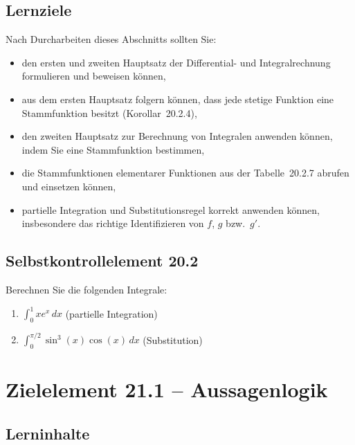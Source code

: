 \documentclass[a4paper,12pt]{article}
\begin{document}
\subsection*{Lernziele}

Nach Durcharbeiten dieses Abschnitts sollten Sie:
\begin{itemize}
  \item den ersten und zweiten Hauptsatz der Differential- und Integralrechnung
        formulieren und beweisen können,
  \item aus dem ersten Hauptsatz folgern können, dass jede stetige Funktion eine
        Stammfunktion besitzt (Korollar~20.2.4),
  \item den zweiten Hauptsatz zur Berechnung von Integralen anwenden können,
        indem Sie eine Stammfunktion bestimmen,
  \item die Stammfunktionen elementarer Funktionen aus der Tabelle~20.2.7
        abrufen und einsetzen können,
  \item partielle Integration und Substitutionsregel korrekt anwenden können,
        insbesondere das richtige Identifizieren von $f$, $g$ bzw.\ $g'$.
\end{itemize}

\subsection*{Selbstkontrollelement 20.2}

Berechnen Sie die folgenden Integrale:
\begin{enumerate}[label=(\alph*)]
  \item $\displaystyle\int_0^1 x e^x\,dx$ \quad (partielle Integration)
  \item $\displaystyle\int_0^{\pi/2} \sin^3(x)\cos(x)\,dx$ \quad (Substitution)
\end{enumerate}

\newpage

\section*{Zielelement 21.1 -- Aussagenlogik}

\subsection*{Lerninhalte}
\end{document}
